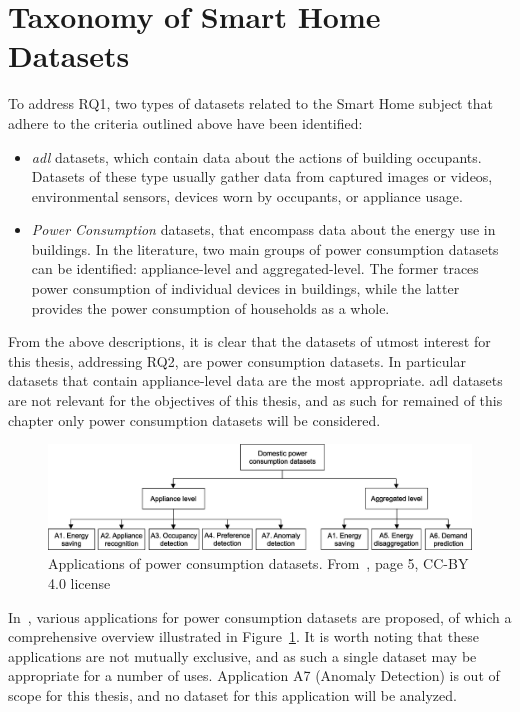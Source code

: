 \newpage

\section{Taxonomy of Smart Home Datasets}

To address RQ1, two types of datasets related to the Smart Home subject that adhere to the criteria outlined above have been identified:
\begin{itemize}
    \item \textit{\acrfull{adl}} datasets, which contain data about the actions of building occupants. Datasets of these type usually gather data from captured images or videos, environmental sensors, devices worn by occupants, or appliance usage.
    \item \textit{Power Consumption} datasets, that encompass data about the energy use in buildings. In the literature, two main groups of power consumption datasets can be identified: appliance-level and aggregated-level. The former traces power consumption of individual devices in buildings, while the latter provides the power consumption of households as a whole.
\end{itemize}
From the above descriptions, it is clear that the datasets of utmost interest for this thesis, addressing RQ2, are power consumption datasets. In particular datasets that contain appliance-level data are the most appropriate. \acrshort{adl} datasets are not relevant for the objectives of this thesis, and as such for remained of this chapter only power consumption datasets will be considered.

\begin{figure}[h]
    \centering
    \includegraphics[width=.9\textwidth]{images/taxonomy_power_consumption.jpg}
    \caption[Applications of power consumption datasets]{Applications of power consumption datasets. From~\textcite{himeurBuildingPowerConsumption2020}, page 5, CC-BY 4.0 license}
    \label{fig:applications_power_consumption_datasets}
\end{figure}

In~\parencite{himeurBuildingPowerConsumption2020}, various applications for power consumption datasets are proposed, of which a comprehensive overview illustrated in Figure~\ref{fig:applications_power_consumption_datasets}. It is worth noting that these applications are not mutually exclusive, and as such a single dataset may be appropriate for a number of uses. Application A7 (Anomaly Detection) is out of scope for this thesis, and no dataset for this application will be analyzed.

